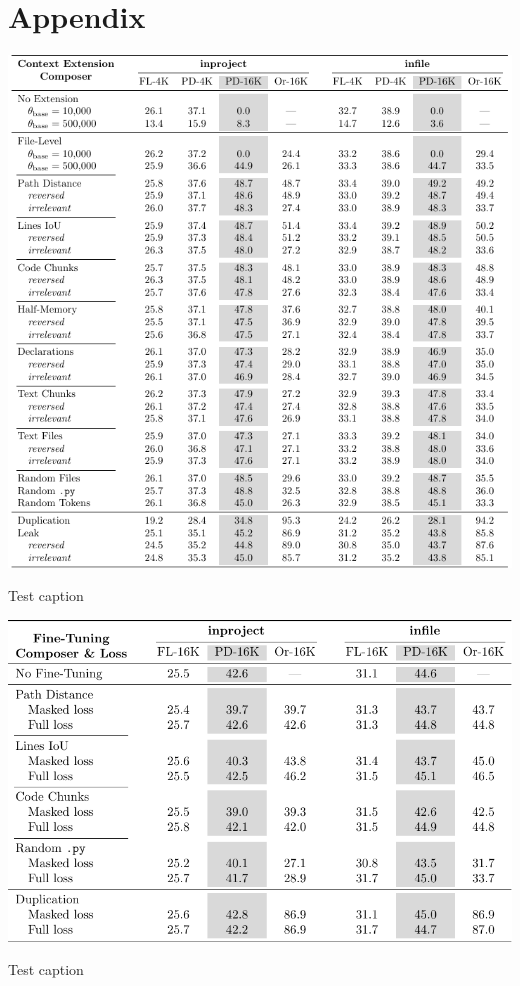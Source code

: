 \chapter{Appendix}

\begin{table}[htbp]
    \centering
    \includegraphics[width=\textwidth]{tables/rq-b.pdf}
    \caption{Test caption}\label{tab:ocoder-extension-extended}
\end{table}

\begin{table}[htbp]
    \centering
    \includegraphics[width=\textwidth]{tables/rq-a2-gradient-masking.pdf}
    \caption{Test caption}\label{tab:dseek-gradient-masking}
\end{table}

